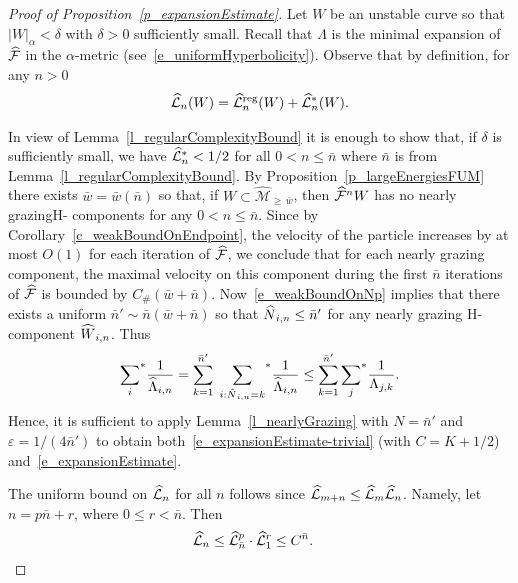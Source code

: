 \documentclass[AHL, Unicode, longabstracts,published]{cedram}
\newcommand{\eps}{\varepsilon}
\newcommand{\const}{C_\#}
\newcommand{\cm}{\mathcal{F}}
\newcommand{\csp}{\mathcal{M}}
\newcommand{\cmp}{\hat\cm}
\newcommand{\cspil}[1]{\widehat{\csp}_{\ge\,#1}}
\newcommand{\Hcomp}{H-\hskip0pt component}
\newcommand{\Hcomps}{H-\hskip0pt components}
\newcommand{\hzreg}{\hat{\cL}^\text{reg}}
\newcommand{\adm}{_{\alpha^{+}}}
\newcommand{\Np}{\hat N}
\newcommand{\cL}{\mathcal{L}}
\renewcommand{\adm}{_{\alpha}}
\let\oldhat\hat
\renewcommand*{\hat}[1]{\mathchoice{\widehat{#1}}{\widehat{#1}}{\oldhat{#1}}{\oldhat{#1}}}
\begin{document}
\begin{proof}[{Proof of Proposition~\ref{p_expansionEstimate}}]
Let $W$ be an unstable curve so that $|W|\adm < \delta$ with $\delta > 0$ sufficiently small. Recall that $\Lambda$ is the minimal expansion of $\cmp$ in the $\alpha$-metric (see~\eqref{e_uniformHyperbolicity}). Observe that by definition, for any $n > 0$
\begin{align*}
\hat \cL_{n}(W) = \hzreg_{n}(W)+\hat \cL^{*}_{n}(W).
\end{align*}


In view of Lemma~\ref{l_regularComplexityBound} it is enough to show that, if $\delta$ is sufficiently small, we have $\hat \cL^{*}_{n} < 1/2$ for all $0 < n\le\bar n$ where $\bar n$ is from Lemma~\ref{l_regularComplexityBound}. By Proposition~\ref{p_largeEnergiesFUM} there exists $\bar w = \bar w(\bar n)$ so that, if $W\subset\cspil{\bar w}$, then $\cmp^{n}W$ has no nearly grazing\linebreak \Hcomps{} for any $0 < n\le\bar n$. Since by Corollary~\ref{c_weakBoundOnEndpoint}, the velocity of the particle increases by at most $O(1)$ for each iteration of $\cmp$, we conclude that for each nearly grazing component, the maximal velocity on this component during the first $\bar n$ iterations of $\cmp$ is bounded by $\const (\bar w+\bar n).$ Now~\eqref{e_weakBoundOnNp} implies that there exists a uniform $\bar n'\sim \bar n(\bar w+\bar n)$ so that $\Np_{i,n}\le\bar n'$ for any nearly grazing \Hcomp{} $\hat W_{i, n}$. Thus
\begin{align*}
{\sum_i}^*\frac1{\hat\Lambda_{i,n}} =
\sum_{k = 1}^{\bar n'}\;{\sum_{i:\Np_{i, n} = k}}^*
\frac1{\hat\Lambda_{i, n}} \le
\sum_{k = 1}^{\bar n'}{\sum_j}^*\frac1{\Lambda_{j,k}}.
\end{align*}
Hence, it is sufficient to apply Lemma~\ref{l_nearlyGrazing} with $N = \bar n'$ and $\eps = 1/(4\bar n')$ to obtain both~\eqref{e_expansionEstimate-trivial} (with $C = K+1/2$) and~\eqref{e_expansionEstimate}.

The uniform bound on $\hat \cL_{n}$ for all $n$ follows since $\hat\cL_{m+n}\le\hat\cL_{m}\hat\cL_{n}$. Namely, let $n = p\bar n+r$, where $0\le r < \bar n$. Then
\begin{align*}
\hat\cL_{n}\le\hat\cL_{\bar n}^{p}\cdot
\hat\cL_{1}^{r}&\le C^{\bar n}.\qedhere
\end{align*}
\end{proof}
\end{document}
